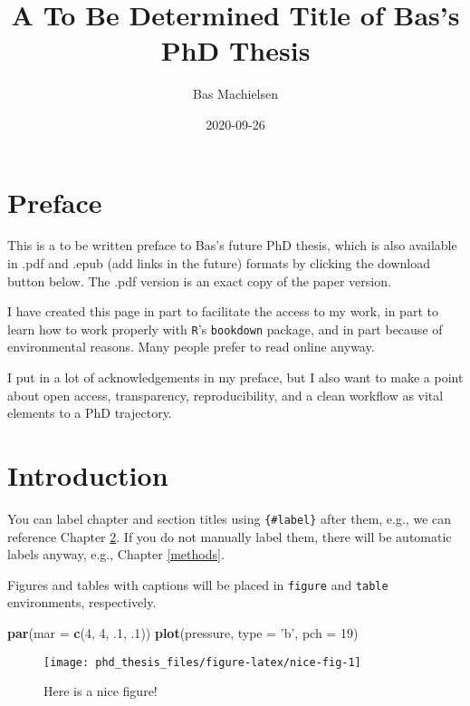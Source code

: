 \documentclass[]{book}
\title{A To Be Determined Title of Bas's PhD Thesis}
\author{Bas Machielsen}
\date{2020-09-26}
\newenvironment{Shaded}{\begin{snugshade}}{\end{snugshade}}
\newcommand{\DataTypeTok}[1]{\textcolor[rgb]{0.13,0.29,0.53}{#1}}
\newcommand{\DecValTok}[1]{\textcolor[rgb]{0.00,0.00,0.81}{#1}}
\newcommand{\FloatTok}[1]{\textcolor[rgb]{0.00,0.00,0.81}{#1}}
\newcommand{\KeywordTok}[1]{\textcolor[rgb]{0.13,0.29,0.53}{\textbf{#1}}}
\newcommand{\NormalTok}[1]{#1}
\newcommand{\StringTok}[1]{\textcolor[rgb]{0.31,0.60,0.02}{#1}}
\begin{document}
\maketitle

{
\setcounter{tocdepth}{1}
\tableofcontents
}
\hypertarget{preface}{%
\chapter{Preface}\label{preface}}

This is a to be written preface to Bas's future PhD thesis, which is also available in .pdf and .epub (add links in the future) formats by clicking the download button below. The .pdf version is an exact copy of the paper version.

I have created this page in part to facilitate the access to my work, in part to learn how to work properly with \texttt{R}'s \texttt{bookdown} package, and in part because of environmental reasons. Many people prefer to read online anyway.

I put in a lot of acknowledgements in my preface, but I also want to make a point about open access, transparency, reproducibility, and a clean workflow as vital elements to a PhD trajectory.

\hypertarget{intro}{%
\chapter{Introduction}\label{intro}}

You can label chapter and section titles using \texttt{\{\#label\}} after them, e.g., we can reference Chapter \ref{intro}. If you do not manually label them, there will be automatic labels anyway, e.g., Chapter \ref{methods}.

Figures and tables with captions will be placed in \texttt{figure} and \texttt{table} environments, respectively.

\begin{Shaded}
\begin{Highlighting}[]
\KeywordTok{par}\NormalTok{(}\DataTypeTok{mar =} \KeywordTok{c}\NormalTok{(}\DecValTok{4}\NormalTok{, }\DecValTok{4}\NormalTok{, }\FloatTok{.1}\NormalTok{, }\FloatTok{.1}\NormalTok{))}
\KeywordTok{plot}\NormalTok{(pressure, }\DataTypeTok{type =} \StringTok{'b'}\NormalTok{, }\DataTypeTok{pch =} \DecValTok{19}\NormalTok{)}
\end{Highlighting}
\end{Shaded}

\begin{figure}

{\centering \texttt{[image: phd\_thesis\_files/figure-latex/nice-fig-1]} 

}

\caption{Here is a nice figure!}\label{fig:nice-fig}
\end{figure}
\end{document}

